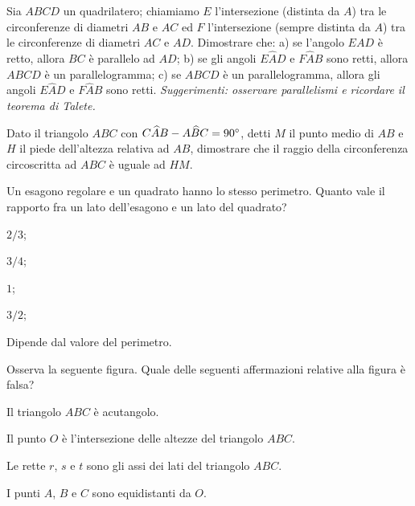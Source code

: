 \begin{esercizio}
\label{ese:5.56}
Sia $ABCD$ un quadrilatero; chiamiamo $E$ l'intersezione (distinta da $A$) tra le circonferenze di diametri $AB$ e $AC$ ed $F$ l'intersezione (sempre distinta da $A$) tra le circonferenze di diametri $AC$ e $AD$. Dimostrare che: a) se l'angolo $EAD$ è retto, allora $BC$ è parallelo ad $AD$; b) se gli angoli $E\widehat{A}D$ e $F\widehat{A}B$ sono retti, allora $ABCD$ è un parallelogramma; c) se $ABCD$ è un parallelogramma, allora gli angoli $E\widehat{A}D$ e $F\widehat{A}B$ sono retti. \emph{Suggerimenti: osservare parallelismi e ricordare il teorema di Talete.}
\end{esercizio}

\begin{esercizio}
\label{ese:5.57}
Dato il triangolo $ABC$ con $C\widehat{A}B-A\widehat{B}C=90{}^{\circ}$, detti $M$ il punto medio di $AB$ e $H$ il piede dell'altezza relativa ad $AB$, dimostrare che il raggio della circonferenza circoscritta ad $ABC$ è uguale ad $HM$.
\end{esercizio}

\begin{esercizio}
\label{ese:5.58}
Un esagono regolare e un quadrato hanno lo stesso perimetro. Quanto vale il rapporto fra un lato dell'esagono e un lato del quadrato?
\begin{multicols}{2}
\begin{enumeratea}
\item $2/3$;
\item $3/4$;
\item $1$;
\item $3/2$;
\item Dipende dal valore del perimetro.
\end{enumeratea}
\end{multicols}
\end{esercizio}

\begin{esercizio}
\label{ese:5.59}
Osserva la seguente figura. Quale delle seguenti affermazioni relative alla figura è falsa?
\begin{enumeratea}
\item Il triangolo $ABC$ è acutangolo.
\item Il punto $O$ è l'intersezione delle altezze del triangolo $ABC$.
\item Le rette $r$, $s$ e $t$ sono gli assi dei lati del triangolo $ABC$.
\item I punti $A$, $B$ e $C$ sono equidistanti da $O$.
\end{enumeratea}
\end{esercizio}

